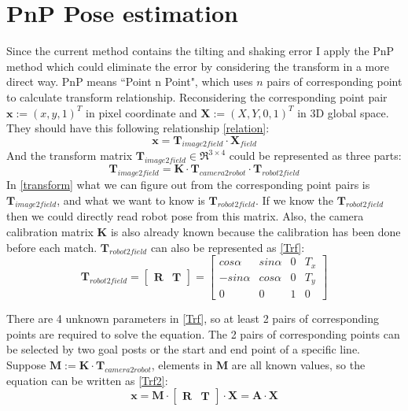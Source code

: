 \section{PnP Pose estimation}
Since the current method contains the tilting and shaking error I apply the PnP method \cite{ETHPnP} which could eliminate the error by considering the transform in a more direct way. PnP means ``Point n Point", which uses $n$ pairs of corresponding point to calculate transform relationship. Reconsidering the corresponding point pair $\mathbf{x}:=(x,y,1)^T$ in pixel coordinate and $\mathbf{X}:=(X,Y,0,1)^T$ in 3D global space. They should have this following relationship \eqref{relation}:
\begin{equation}
\mathbf{x} = \mathbf{T}_{image2field} \cdot \mathbf{X}_{field} \label{relation}
\end{equation}
And the transform matrix $\mathbf{T}_{image2field} \in \mathfrak{R}^{3 \times 4}$ could be represented as three parts: 
\begin{equation}
\mathbf{T}_{image2field}=\mathbf{K} \cdot \mathbf{T}_{camera2robot} \cdot \mathbf{T}_{robot2field} \label{transform}
\end{equation}
In \eqref{transform} what we can figure out from the corresponding point pairs is $\mathbf{T}_{image2field}$, and what we want to know is $\mathbf{T}_{robot2field}$. If we know the $\mathbf{T}_{robot2field}$ then we could directly read robot pose from this matrix. Also, the camera calibration matrix $\mathbf{K}$ is also already known because the calibration has been done before each match. 
$\mathbf{T}_{robot2field}$ can also be represented as \eqref{Trf}:
\begin{equation}\mathbf{T}_{robot2field}=
\begin{bmatrix}
\mathbf{R} & \mathbf{T}
\end{bmatrix}=
\begin{bmatrix}
cos\alpha & sin\alpha & 0 & T_x\\
-sin\alpha & cos\alpha & 0 & T_y\\
0 & 0 & 1 & 0
\end{bmatrix} \label{Trf}
\end{equation}

There are 4 unknown parameters in \eqref{Trf}, so at least 2 pairs of corresponding points are required to solve the equation. The 2 pairs of corresponding points can be selected by two goal posts or the start and end point of a specific line. Suppose $\mathbf{M}:=\mathbf{K} \cdot \mathbf{T}_{camera2robot}$, elements in $\mathbf{M}$ are all known values, so the equation can be written as \eqref{Trf2}:
\begin{equation}\mathbf{x}=\mathbf{M} \cdot
\begin{bmatrix}
\mathbf{R} & \mathbf{T}
\end{bmatrix} \cdot \mathbf{X} =\mathbf{A}\cdot \mathbf{X}
\label{Trf2}
\end{equation}

